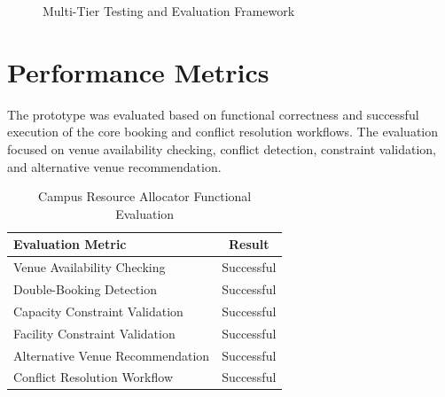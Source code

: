 \documentclass[12pt, a4paper, oneside]{report}
\begin{document}
\begin{figure}[H]
\centering
{}
\caption{Multi-Tier Testing and Evaluation Framework}
\label{fig:testing}
\end{figure}
\section{Performance Metrics}

The prototype was evaluated based on functional correctness and successful execution of the core booking and conflict resolution workflows. The evaluation focused on venue availability checking, conflict detection, constraint validation, and alternative venue recommendation.

\begin{table}[H]
\centering
\small
\begin{tabular}{lc}
\toprule
\textbf{Evaluation Metric} & \textbf{Result} \\
\midrule
Venue Availability Checking & Successful \\
Double-Booking Detection & Successful \\
Capacity Constraint Validation & Successful \\
Facility Constraint Validation & Successful \\
Alternative Venue Recommendation & Successful \\
Conflict Resolution Workflow & Successful \\
\bottomrule
\end{tabular}
\caption{Campus Resource Allocator Functional Evaluation}
\label{tab:metrics}
\end{table}
\end{document}
